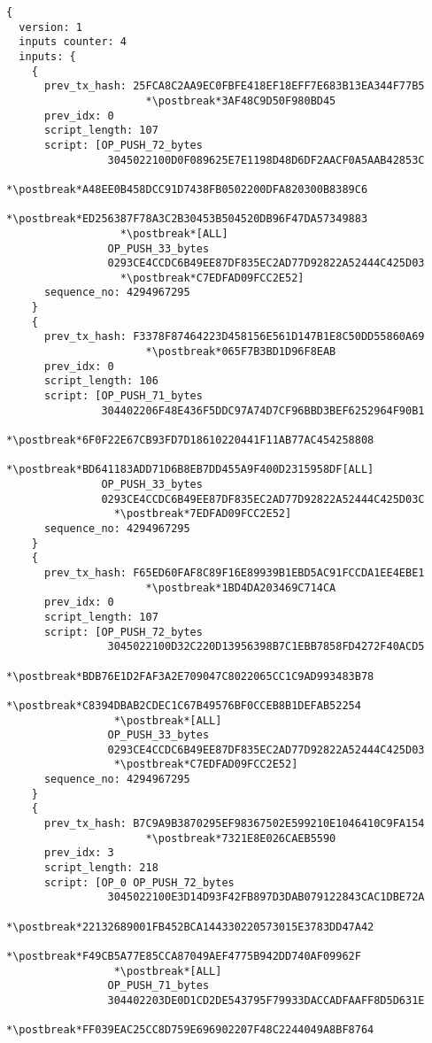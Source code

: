 \begin{lstlisting}
{
  version: 1
  inputs counter: 4
  inputs: {
    {
      prev_tx_hash: 25FCA8C2AA9EC0FBFE418EF18EFF7E683B13EA344F77B5
                      *\postbreak*3AF48C9D50F980BD45
      prev_idx: 0
      script_length: 107
      script: [OP_PUSH_72_bytes
                3045022100D0F089625E7E1198D48D6DF2AACF0A5AAB42853C
                  *\postbreak*A48EE0B458DCC91D7438FB0502200DFA820300B8389C6
                  *\postbreak*ED256387F78A3C2B30453B504520DB96F47DA57349883
                  *\postbreak*[ALL]
                OP_PUSH_33_bytes
                0293CE4CCDC6B49EE87DF835EC2AD77D92822A52444C425D03
                  *\postbreak*C7EDFAD09FCC2E52]
      sequence_no: 4294967295
    }
    {
      prev_tx_hash: F3378F87464223D458156E561D147B1E8C50DD55860A69
                      *\postbreak*065F7B3BD1D96F8EAB
      prev_idx: 0
      script_length: 106
      script: [OP_PUSH_71_bytes
               304402206F48E436F5DDC97A74D7CF96BBD3BEF6252964F90B1
                 *\postbreak*6F0F22E67CB93FD7D18610220441F11AB77AC454258808
                 *\postbreak*BD641183ADD71D6B8EB7DD455A9F400D2315958DF[ALL]
               OP_PUSH_33_bytes
               0293CE4CCDC6B49EE87DF835EC2AD77D92822A52444C425D03C
                 *\postbreak*7EDFAD09FCC2E52]
      sequence_no: 4294967295
    }
    {
      prev_tx_hash: F65ED60FAF8C89F16E89939B1EBD5AC91FCCDA1EE4EBE1
                      *\postbreak*1BD4DA203469C714CA
      prev_idx: 0
      script_length: 107
      script: [OP_PUSH_72_bytes
                3045022100D32C220D13956398B7C1EBB7858FD4272F40ACD5
                 *\postbreak*BDB76E1D2FAF3A2E709047C8022065CC1C9AD993483B78
                 *\postbreak*C8394DBAB2CDEC1C67B49576BF0CCEB8B1DEFAB52254
                 *\postbreak*[ALL]
                OP_PUSH_33_bytes
                0293CE4CCDC6B49EE87DF835EC2AD77D92822A52444C425D03
                 *\postbreak*C7EDFAD09FCC2E52]
      sequence_no: 4294967295
    }
    {
      prev_tx_hash: B7C9A9B3870295EF98367502E599210E1046410C9FA154
                      *\postbreak*7321E8E026CAEB5590
      prev_idx: 3
      script_length: 218
      script: [OP_0 OP_PUSH_72_bytes
                3045022100E3D14D93F42FB897D3DAB079122843CAC1DBE72A
                 *\postbreak*22132689001FB452BCA144330220573015E3783DD47A42
                 *\postbreak*F49CB5A77E85CCA87049AEF4775B942DD740AF09962F
                 *\postbreak*[ALL]
                OP_PUSH_71_bytes
                304402203DE0D1CD2DE543795F79933DACCADFAAFF8D5D631E
                 *\postbreak*FF039EAC25CC8D759E696902207F48C2244049A8BF8764

\end{lstlisting}
